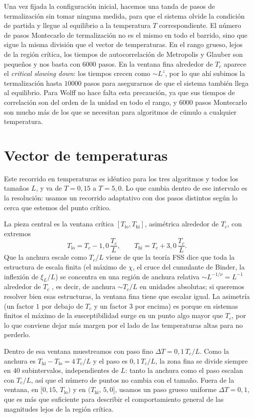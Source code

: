 Una vez fijada la configuración inicial, hacemos una tanda de pasos de termalización sin tomar ninguna medida, para que el sistema olvide la condición de partida y llegue al equilibrio a la temperatura $T$ correspondiente. El número de pasos Montecarlo de termalización no es el mismo en todo el barrido, sino que sigue la misma división que el vector de temperaturas. En el rango grueso, lejos de la región crítica, los tiempos de autocorrelación de Metropolis y Glauber son pequeños y nos basta con $6000$ pasos. En la ventana fina alrededor de $T_c$ aparece el \textit{critical slowing down}: los tiempos crecen como $\sim L^z$, por lo que ahí subimos la termalización hasta $10000$ pasos para asegurarnos de que el sistema también llega al equilibrio. Para Wolff no hace falta esta precaución, ya que sus tiempos de correlación son del orden de la unidad en todo el rango, y $6000$ pasos Montecarlo son mucho más de los que se necesitan para algoritmos de cúmulo a cualquier temperatura.

\section{Vector de temperaturas}

Este recorrido en temperaturas es idéntico para los tres algoritmos y todos los tamaños $L$, y va de $T = 0{,}15$ a $T = 5{,}0$. Lo que cambia dentro de ese intervalo es la resolución: usamos un recorrido adaptativo con dos pasos distintos según lo cerca que estemos del punto crítico.

La pieza central es la ventana crítica $[T_{\text{lo}}, T_{\text{hi}}]$, asimétrica alrededor de $T_c$, con extremos
\[
T_{\text{lo}} = T_c - 1{,}0\,\frac{T_c}{L}, \qquad T_{\text{hi}} = T_c + 3{,}0\,\frac{T_c}{L}.
\]
Que la anchura escale como $T_c/L$ viene de que la teoría FSS dice que toda la estructura de escala finita (el máximo de $\chi$, el cruce del cumulante de Binder, la inflexión de $\xi_L/L$) se concentra en una región de anchura relativa $\sim L^{-1/\nu} = L^{-1}$ alrededor de $T_c$ \citep{Newman1999}, es decir, de anchura $\sim T_c/L$ en unidades absolutas; si queremos resolver bien esas estructuras, la ventana fina tiene que escalar igual. La asimetría (un factor $1$ por debajo de $T_c$ y un factor $3$ por encima) es porque en sistemas finitos el máximo de la susceptibilidad surge en un punto algo mayor que $T_c$, por lo que conviene dejar más margen por el lado de las temperaturas altas para no perderlo.

Dentro de esa ventana muestreamos con paso fino $\Delta T = 0{,}1\,T_c/L$. Como la anchura es $T_{\text{hi}} - T_{\text{lo}} = 4\,T_c/L$ y el paso es $0{,}1\,T_c/L$, la zona fina se divide siempre en $40$ subintervalos, independientes de $L$: tanto la anchura como el paso escalan con $T_c/L$, así que el número de puntos no cambia con el tamaño. Fuera de la ventana, en $[0{,}15,\, T_{\text{lo}})$ y en $(T_{\text{hi}},\, 5{,}0]$, usamos un paso grueso uniforme $\Delta T = 0{,}1$, que es más que suficiente para describir el comportamiento general de las magnitudes lejos de la región crítica.

